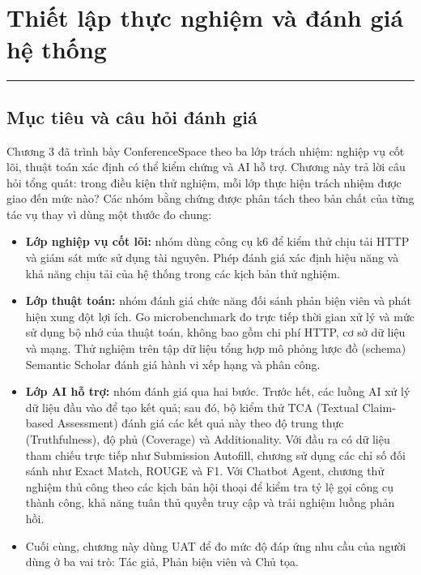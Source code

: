 \chapter{Thiết lập thực nghiệm và đánh giá hệ thống}
\label{Chapter4}

\par\noindent\rule{\textwidth}{0.4pt}\par

\section{Mục tiêu và câu hỏi đánh giá}

Chương 3 đã trình bày ConferenceSpace theo ba lớp trách nhiệm: nghiệp vụ cốt lõi, thuật toán xác định có thể kiểm chứng và AI hỗ trợ. Chương này trả lời câu hỏi tổng quát: trong điều kiện thử nghiệm, mỗi lớp thực hiện trách nhiệm được giao đến mức nào? Các nhóm bằng chứng được phân tách theo bản chất của từng tác vụ thay vì dùng một thước đo chung:

\begin{itemize}
  \item \textbf{Lớp nghiệp vụ cốt lõi:} nhóm dùng công cụ k6 để kiểm thử chịu tải HTTP và giám sát mức sử dụng tài nguyên. Phép đánh giá xác định hiệu năng và khả năng chịu tải của hệ thống trong các kịch bản thử nghiệm.
  \item \textbf{Lớp thuật toán:} nhóm đánh giá chức năng đối sánh phản biện viên và phát hiện xung đột lợi ích. Go microbenchmark đo trực tiếp thời gian xử lý và mức sử dụng bộ nhớ của thuật toán, không bao gồm chi phí HTTP, cơ sở dữ liệu và mạng. Thử nghiệm trên tập dữ liệu tổng hợp mô phỏng lược đồ (schema) Semantic Scholar đánh giá hành vi xếp hạng và phân công.
  \item \textbf{Lớp AI hỗ trợ:} nhóm đánh giá qua hai bước. Trước hết, các luồng AI xử lý dữ liệu đầu vào để tạo kết quả; sau đó, bộ kiểm thử TCA (Textual Claim-based Assessment) đánh giá các kết quả này theo độ trung thực (Truthfulness), độ phủ (Coverage) và Additionality. Với đầu ra có dữ liệu tham chiếu trực tiếp như Submission Autofill, chương sử dụng các chỉ số đối sánh như Exact Match, ROUGE và F1. Với Chatbot Agent, chương thử nghiệm thủ công theo các kịch bản hội thoại để kiểm tra tỷ lệ gọi công cụ thành công, khả năng tuân thủ quyền truy cập và trải nghiệm luồng phản hồi.
  \item Cuối cùng, chương này dùng UAT để đo mức độ đáp ứng nhu cầu của người dùng ở ba vai trò: Tác giả, Phản biện viên và Chủ tọa.
\end{itemize}

